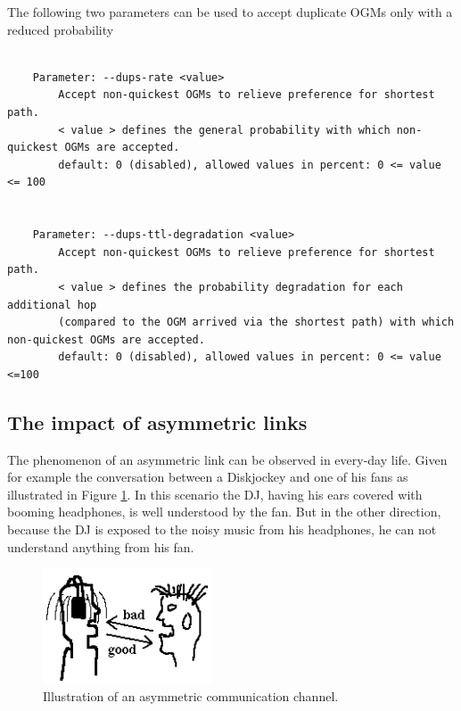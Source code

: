\documentclass[11pt]{article}
\begin{document}
The following two parameters can be used to accept duplicate OGMs only with a reduced probability


\begin{small}
\begin{verbatim}

    Parameter: --dups-rate <value> 
        Accept non-quickest OGMs to relieve preference for shortest path.
        < value > defines the general probability with which non-quickest OGMs are accepted. 
        default: 0 (disabled), allowed values in percent: 0 <= value <= 100


    Parameter: --dups-ttl-degradation <value> 
        Accept non-quickest OGMs to relieve preference for shortest path.
        < value > defines the probability degradation for each additional hop 
        (compared to the OGM arrived via the shortest path) with which non-quickest OGMs are accepted. 
        default: 0 (disabled), allowed values in percent: 0 <= value <=100

\end{verbatim}
\end{small}






\subsection{The impact of asymmetric links}
\label{sec:asymmetric-links}

The phenomenon of an asymmetric link can be observed in every-day life. Given for example the conversation between a Diskjockey and one of his fans as illustrated in Figure \ref{fig:asymmetric-link}. In this scenario the DJ, having his ears covered with booming headphones, is well understood by the fan. But in the other direction, because the DJ is exposed to the noisy music from his headphones, he can not understand anything from his fan. 

\begin{figure}[htbp]
  \begin{center}
    \includegraphics[width=5cm]{KopfoererTyp-x01-selected.png}
    \caption{Illustration of an asymmetric communication channel.}
    \label{fig:asymmetric-link}
  \end{center}
\end{figure}
\end{document}
